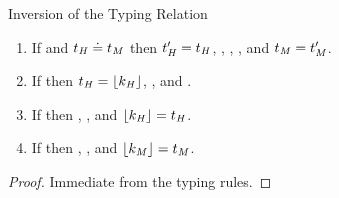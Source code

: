 \begin{lemma}{Inversion of the Typing Relation}
\begin{enumerate}

\item If \judeh{\env}{\exphm{\first{\vartyh}}{\first{\vartym}}{\varexpm}}{\second{\vartyh}} and $t_{\mathit{H}} \doteq t_{\mathit{M}}$ then $t_{\mathit{H}}' = t_{\mathit{H}}$, \judth{\env}{\first{\vartyh}}, \judtm{\env}{\first{\vartym}}, \judem{\env}{\varexpm}{\second{\vartym}}, and $t_{\mathit{M}} = t_{\mathit{M}}'$.


\item If \judeh{\env}{\exphs{\varcsh}{\varexps}}{\vartyh} then $t_{\mathit{H}} = \lfloor k_{\mathit{H}} \rfloor$, \judth{\env}{\tyunbrand{\varcsh}}, and \judes{\env}{\varexps}{\tytst}.



\item If \judes{\env}{\expsh{\varcsh}{\varexph}}{\tytst} then \judth{\env}{\tyunbrand{\varcsh}}, \judeh{\env}{\varexph}{\vartyh}, and $\lfloor k_{\mathit{H}} \rfloor = t_{\mathit{H}}$.


\item If \judes{\env}{\expsm{\varcsm}{\varexpm}}{\tytst} then \judtm{\env}{\tyunbrand{\varcsm}}, \judem{\env}{\varexpm}{\vartym}, and $\lfloor k_{\mathit{M}} \rfloor = t_{\mathit{M}}$.

\end{enumerate}

\begin{proof}

Immediate from the typing rules.

\end{proof}

\end{lemma}
